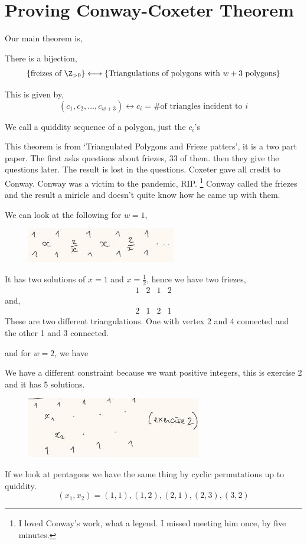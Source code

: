 \documentclass{article}
\begin{document}
\section{Proving Conway-Coxeter Theorem}
Our main theorem is,
\begin{nthm}
  There is a bijection,
  $$ \{\text{freizes of $\Z_{>0}$}\} \longleftrightarrow \{\text{Triangulations of polygons with $w + 3$ polygons} \} $$
\end{nthm}
This is given by,
$$ (c_1,c_2,\dots,c_{w+3}) \longleftrightarrow c_i = \text{\# of triangles incident to $i$} $$

\begin{ndefi}
  We call a quiddity sequence of a polygon, just the $c_i$'s
\end{ndefi}

This theorem is from `Triangulated Polygons and Frieze patters', it is a two part paper. The first asks questions about friezes, 33 of them. then they give the questions later. The result is lost in the questions. Coxeter gave all credit to Conway. Conway was a victim to the pandemic, RIP. \footnote{I loved Conway's work, what a legend. I missed meeting him once, by five minutes.}
Conway called the friezes and the result a miricle and doesn't quite know how he came up with them.

\begin{eg}
  We can look at the following for $w=1$,
  \begin{figure}[!ht]
    \centering
    \includegraphics{./figures/L2.1}
  \end{figure}
  It has two solutions of $x = 1$ and $x = \frac{1}{2}$, hence we have two friezes,
  $$ \begin{matrix}
    1 & 2 & 1 & 2
  \end{matrix} $$
  and,
  $$ \begin{matrix}
    2 & 1 & 2 & 1
  \end{matrix} $$
  These are two different triangulations. One with vertex 2 and 4 connected and the other 1 and 3 connected.
\end{eg}

and for $w = 2$, we have
\begin{eg}
  We have a different constraint because we want positive integers, this is exercise 2 and it has 5 solutions.
  \begin{figure}[!ht]
    \centering
    \includegraphics{./figures/L2.2}
  \end{figure}
  If we look at pentagons we have the same thing by cyclic permutations up to quiddity.
  $$ (x_1, x_2) = (1, 1) ,(1, 2), (2, 1), (2, 3), (3, 2) $$
\end{eg}
\end{document}
